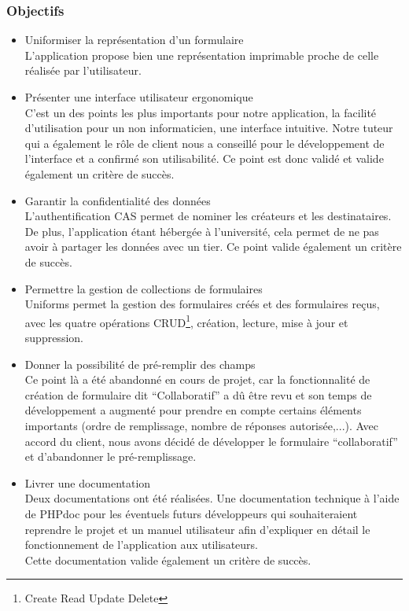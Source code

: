 \documentclass{sigplanconf}
\begin{document}
\subsubsection{Objectifs}
\begin{itemize}
\item Uniformiser la représentation d'un formulaire\\
L’application propose bien une représentation imprimable proche de celle réalisée par l’utilisateur.
\item Présenter une interface utilisateur ergonomique\\
C’est un des points les plus importants pour notre application, la facilité d’utilisation pour un non informaticien, une interface intuitive. Notre tuteur qui a également le rôle de client nous a conseillé pour le développement de l’interface et a confirmé son utilisabilité. Ce point est donc validé et valide également un critère de succès.
\item Garantir la confidentialité des données\\
L’authentification CAS permet de nominer les créateurs et les destinataires. De plus, l’application étant hébergée à l’université, cela permet de ne pas avoir à partager les données avec un tier. Ce point valide également un critère de succès.
\item Permettre la gestion de collections de formulaires\\
Uniforms permet la gestion des formulaires créés et des formulaires reçus, avec les quatre opérations CRUD\footnote{Create Read Update Delete}, création, lecture, mise à jour et suppression.
\item Donner la possibilité de pré-remplir des champs\\
Ce point là a été abandonné en cours de projet, car la fonctionnalité de création de formulaire dit “Collaboratif” a dû être revu et son temps de développement a augmenté pour prendre en compte certains éléments importants (ordre de remplissage, nombre de réponses autorisée,...). Avec accord du client, nous avons décidé de développer le formulaire “collaboratif” et d’abandonner le pré-remplissage.
\item Livrer une documentation\\
Deux documentations ont été réalisées. Une documentation technique à l’aide de PHPdoc pour les éventuels futurs développeurs qui souhaiteraient reprendre le projet et un manuel utilisateur afin d’expliquer en détail le fonctionnement de l’application aux utilisateurs.\\
Cette documentation valide également un critère de succès.
\end{itemize}
\end{document}
